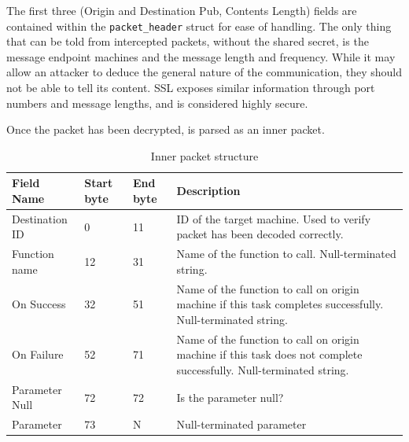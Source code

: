 \documentclass{article}
\begin{document}
The first three (Origin and Destination Pub, Contents Length) fields are contained within the \texttt{packet\_header} struct for ease of handling. The only thing that can be told from intercepted packets, without the shared secret, is the message endpoint machines and the message length and frequency. While it may allow an attacker to deduce the general nature of the communication, they should not be able to tell its content. SSL exposes similar information through port numbers and message lengths, and is considered highly secure.

Once the packet has been decrypted, is parsed as an inner packet.

\begin{table}[H]
\begin{tabular}{|p{25mm}|l|l|p{45mm}|}
\hline
\textbf{Field Name}	& \textbf{Start byte}		& \textbf{End byte}		& \textbf{Description} \\ \hline
Destination ID			& 0											& 11									& ID of the target machine. Used to verify packet has been decoded correctly.  \\ \hline
Function name				& 12										& 31									& Name of the function to call. Null-terminated string.  \\ \hline
On Success					& 32										& 51									& Name of the function to call on origin machine if this task completes successfully. Null-terminated string. \\ \hline
On Failure					& 52										& 71									& Name of the function to call on origin machine if this task does not complete successfully. Null-terminated string. \\ \hline
Parameter Null			& 72										& 72									& Is the parameter null? \\ \hline
Parameter						& 73										& N										& Null-terminated parameter \\ \hline
\end{tabular}
\caption{Inner packet structure}
\end{table}
\end{document}
